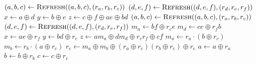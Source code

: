 \tiny
        \begin{algorithmic}
                \State $(a,b,c) \gets \textsc{Refresh}((a,b,c),(r_a,r_b,r_c))$
                \State $(d,e,f) \gets \textsc{Refresh}((d,e,f),(r_d,r_e,r_f))$
                \State $x \gets a \oplus d$
                \State $y \gets b \oplus e$
                \State $z \gets c \oplus f \oplus ae \oplus bd$
                \State {}
            \EndFunction
            \Statex
                \State $(a,b,c) \gets \textsc{Refresh}((a,b,c),(r_a,r_b,r_c))$
                \State $(d,e,f) \gets \textsc{Refresh}((d,e,f),(r_d,r_e,r_f))$
                \State $m_a \gets bf \oplus r_c e$
                \State $m_d \gets ce \oplus r_f b$
                \State $x \gets ae \oplus r_f$
                \State $y \gets bd \oplus r_c$
                \State $z \gets am_a \oplus dm_d \oplus r_c r_f \oplus cf$
                \State {}
            \EndFunction
            \Statex
                \State $m_a \gets r_a \cdot (b \oplus r_c)$
                \State $m_b \gets r_b \cdot (a \oplus r_c)$
                \State $r_c \gets
                    m_a \oplus m_b \oplus
                    (r_a \oplus r_c) (r_b \oplus r_c) \oplus
                    r_c$
                \State $a \gets a \oplus r_a$
                \State $b \gets b \oplus r_b$
                \State $c \gets c \oplus r_c$
                \State {}
            \EndFunction
        \end{algorithmic}